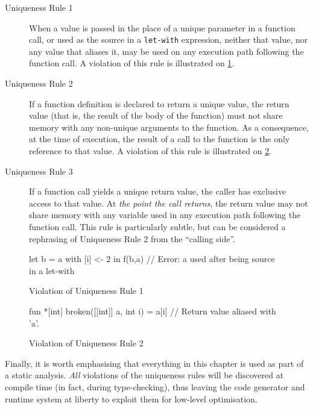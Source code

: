 \documentclass[oneside]{memoir}
\newcommand{\emp}[1]{\textcolor{DikuRed}{ #1}}
\begin{document}
\begin{description}
\item[Uniqueness Rule 1] When a value is passed in the place of a
  unique parameter in a function call, or used as the source in a
  \texttt{let-with} expression, neither that value, nor any value that
  aliases it, may be used on any execution path following the function
  call.  A violation of this rule is illustrated on
  \cref{fig:uniqueness-rule-1-violation}.

\item[Uniqueness Rule 2] If a function definition is declared to
  return a unique value, the return value (that is, the result of the
  body of the function) must not share memory with any non-unique
  arguments to the function.  As a consequence, at the time of
  execution, the result of a call to the function is the only
  reference to that value.  A violation of this rule is illustrated on
  \cref{fig:uniqueness-rule-2-violation}.

\item[Uniqueness Rule 3] If a function call yields a unique return
  value, the caller has exclusive access to that value.  At
  \textit{the point the call returns}, the return value may not share
  memory with any variable used in any execution path following the
  function call.  This rule is particularly subtle, but can be
  considered a rephrasing of Uniqueness Rule 2 from the ``calling
  side''.
\end{description}

\begin{figure}
\centering
\begin{colorcode}
let b = a with [i] <- 2 in
f(b,a) // \emp{Error:} a used after being source in a let-with
\end{colorcode}
\caption{Violation of Uniqueness Rule 1}
\label{fig:uniqueness-rule-1-violation}
\end{figure}

\begin{figure}
\centering
\begin{colorcode}
fun *[int] broken([[int]] a, int i) =
  a[i] // Return value aliased with 'a'.
\end{colorcode}
\caption{Violation of Uniqueness Rule 2}
\label{fig:uniqueness-rule-2-violation}
\end{figure}

Finally, it is worth emphasising that everything in this chapter is
used as part of a static analysis.  \textit{All} violations of the
uniqueness rules will be discovered at compile time (in fact, during
type-checking), thus leaving the code generator and runtime system at
liberty to exploit them for low-level optimisation.
\end{document}

